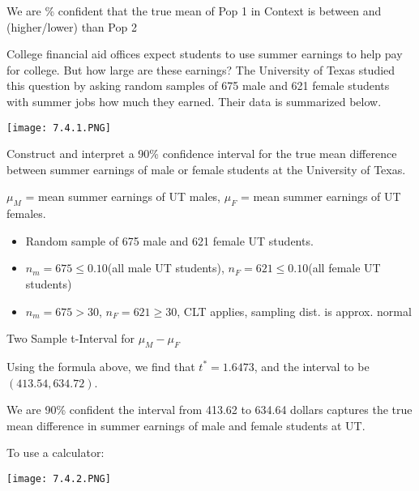 \documentclass[../stats.tex]{subfiles}
\begin{document}
We are \blank\% confident that the true mean of {Pop 1 in Context} is between \blank and  (higher/lower) than {Pop 2}
\begin{example}
    College financial aid offices expect students to use summer earnings to help pay for college. But how large are these earnings? The University of Texas studied this question by asking 
    random samples of 675 male and 621 female students with summer jobs how much they earned. Their data is summarized below.
    \begin{center}
        \texttt{[image: 7.4.1.PNG]}
    \end{center}
    Construct and interpret a 90\% confidence interval for the true mean difference between summer earnings of male or female students at the University of Texas.

    $\mu_M$ = mean summer earnings of UT males, $\mu_F$ = mean summer earnings of UT females.

    \begin{itemize}
        \item Random sample of 675 male and 621 female UT students.
        \item $n_m=675\leq 0.10$(all male UT students), $n_F=621\leq 0.10$(all female UT students)
        \item $n_m=675>30$, $n_F=621\geq 30$, CLT applies, sampling dist. is approx. normal 
    \end{itemize}

    Two Sample t-Interval for $\mu_M-\mu_F$

    Using the formula above, we find that $t^* = 1.6473$, and the interval to be $(413.54,634.72)$.

    We are 90\% confident the interval from 413.62 to 634.64 dollars captures the true mean difference in summer earnings of male and female students at UT.

    To use a calculator:
    \begin{center}
        \texttt{[image: 7.4.2.PNG]}
    \end{center}
\end{example}
\end{document}
